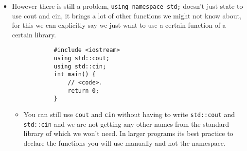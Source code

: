 \begin{itemize}
    \item However there is still a problem, \texttt{using namespace std;} doesn't just state to use cout and cin, it brings a lot of other functions we might not know about, for this we can explicitly say we just want to use a certain function of a certain library.
        \begin{verbatim}
            #include <iostream> 
            using std::cout;
            using std::cin;
            int main() {
                // <code>.
                return 0;
            }
        \end{verbatim}
        \begin{itemize}
            \item You can still use \texttt{cout} and \texttt{cin} without having to write \texttt{std::cout} and \texttt{std::cin} and we are not getting any other names from the standard library of which we won't need. In larger programs its best practice to declare the functions you will use manually and not the namespace.
        \end{itemize}
\end{itemize}


